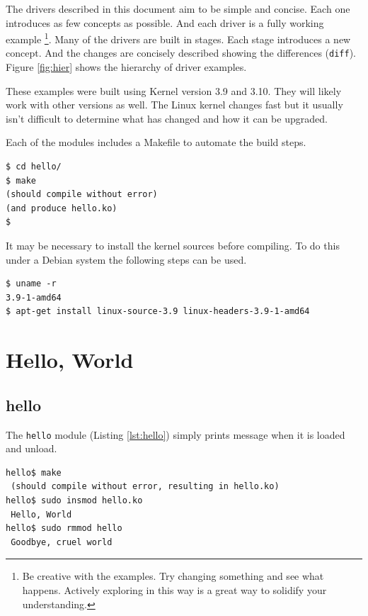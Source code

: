 \documentclass{article}
\begin{document}
The drivers described in this document aim to be simple and concise.
Each one introduces as few concepts as possible.
And each driver is a fully working example
\footnote{Be creative with the examples.
Try changing something and see what happens.
Actively exploring in this way is a great way to solidify your understanding.}.
Many of the drivers are built in stages.
Each stage introduces a new concept.
And the changes are concisely described showing the
differences (\verb+diff+).
Figure \ref{fig:hier} shows the hierarchy of driver examples.

These examples were built using Kernel version 3.9 and 3.10.
They will likely work with other versions as well.
The Linux kernel changes fast but it usually isn't difficult to
determine what has changed and how it can be upgraded.

Each of the modules includes a Makefile to automate the build steps.

\begin{verbatim}
$ cd hello/
$ make
(should compile without error)
(and produce hello.ko)
$
\end{verbatim}

It may be necessary to install the kernel sources before compiling.
To do this under a Debian\autocite{debian} system the following steps
can be used.

\begin{verbatim}
$ uname -r
3.9-1-amd64
$ apt-get install linux-source-3.9 linux-headers-3.9-1-amd64

\end{verbatim}


\section{Hello, World}

\subsection{hello}

The \verb+hello+ module (Listing \ref{lst:hello}) simply prints message
when it is loaded and unload.

\begin{verbatim}
hello$ make
 (should compile without error, resulting in hello.ko)
hello$ sudo insmod hello.ko
 Hello, World
hello$ sudo rmmod hello
 Goodbye, cruel world
\end{verbatim}
\end{document}
